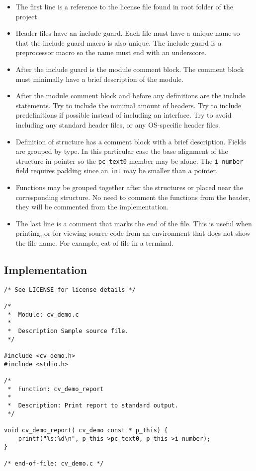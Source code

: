 \documentclass[12pt]{article}
\begin{document}
\begin{itemize}

\item The first line is a reference to the license file found in root folder
    of the project.

\item Header files have an include guard.  Each file must have a unique name
    so that the include guard macro is also unique.  The include guard is
    a preprocessor macro so the name must end with an underscore.

\item After the include guard is the module comment block.  The comment block
    must minimally have a brief description of the module.

\item After the module comment block and before any definitions are the include
    statements.  Try to include the minimal amount of headers.  Try to include
    predefinitions if possible instead of including an interface.  Try to
    avoid including any standard header files, or any OS-specific header
    files.

\item Definition of structure has a comment block with a brief description.
    Fields are grouped by type.  In this particular case the base alignment
    of the structure in pointer so the \texttt{pc\_text0} member may be
        alone.  The \texttt{i\_number} field requires padding since an
        \texttt{int} may be smaller than a pointer.

\item Functions may be grouped together after the structures or placed near
    the corresponding structure.  No need to comment the functions from
        the header, they will be commented from the implementation.

\item The last line is a comment that marks the end of the file.  This is
    useful when printing, or for viewing source code from an environment that
        does not show the file name.  For example, cat of file in a terminal.

\end{itemize}

\subsection{Implementation}

\begin{lstlisting}[caption={cv\_demo.c}]
/* See LICENSE for license details */

/*
 *  Module: cv_demo.c
 *
 *  Description Sample source file.
 */

#include <cv_demo.h>
#include <stdio.h>

/*
 *  Function: cv_demo_report
 *
 *  Description: Print report to standard output.
 */

void cv_demo_report( cv_demo const * p_this) {
    printf("%s:%d\n", p_this->pc_text0, p_this->i_number);
}

/* end-of-file: cv_demo.c */
\end{lstlisting}

\lstlistoflistings
\end{document}
